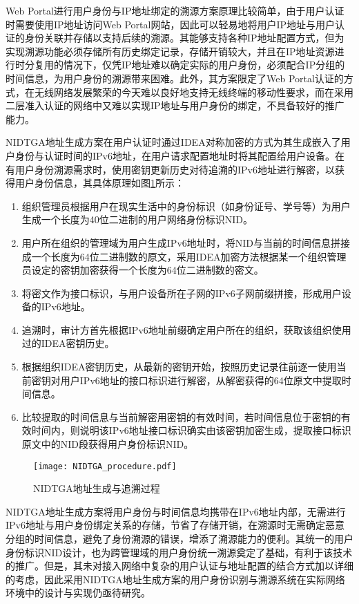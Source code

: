       Web Portal进行用户身份与IP地址绑定的溯源方案原理比较简单，由于用户认证时需要使用IP地址访问Web Portal网站，因此可以轻易地将用户IP地址与用户认证的身份关联并存储以支持后续的溯源。其能够支持各种IP地址配置方式，但为实现溯源功能必须存储所有历史绑定记录，存储开销较大，并且在IP地址资源进行时分复用的情况下，仅凭IP地址难以确定实际的用户身份，必须配合IP分组的时间信息，为用户身份的溯源带来困难。此外，其方案限定了Web Portal认证的方式，在无线网络发展繁荣的今天难以良好地支持无线终端的移动性要求，而在采用二层准入认证的网络中又难以实现IP地址与用户身份的绑定，不具备较好的推广能力。
    
      NIDTGA地址生成方案\cite{liu2015building}在用户认证时通过IDEA对称加密的方式为其生成嵌入了用户身份与认证时间的IPv6地址，在用户请求配置地址时将其配置给用户设备。在有用户身份溯源需求时，使用密钥更新历史对待追溯的IPv6地址进行解密，以获得用户身份信息，其具体原理如图\ref{fig:NIDTGA_procedure}所示：
      \begin{enumerate}[1{)}]
        \item 组织管理员根据用户在现实生活中的身份标识（如身份证号、学号等）为用户生成一个长度为40位二进制的用户网络身份标识NID。
        \item 用户所在组织的管理域为用户生成IPv6地址时，将NID与当前的时间信息拼接成一个长度为64位二进制数的原文，采用IDEA加密方法根据某一个组织管理员设定的密钥加密获得一个长度为64位二进制数的密文。
        \item 将密文作为接口标识，与用户设备所在子网的IPv6子网前缀拼接，形成用户设备的IPv6地址。
        \item 追溯时，审计方首先根据IPv6地址前缀确定用户所在的组织，获取该组织使用过的IDEA密钥历史。
        \item 根据组织IDEA密钥历史，从最新的密钥开始，按照历史记录往前逐一使用当前密钥对用户IPv6地址的接口标识进行解密，从解密获得的64位原文中提取时间信息。
        \item 比较提取的时间信息与当前解密用密钥的有效时间，若时间信息位于密钥的有效时间内，则说明该IPv6地址接口标识确实由该密钥加密生成，提取接口标识原文中的NID段获得用户身份标识NID。
      \end{enumerate}
    
      \begin{figure}[ht]
        \centering
        \texttt{[image: NIDTGA\_procedure.pdf]}
        \caption{NIDTGA地址生成与追溯过程}
        \label{fig:NIDTGA_procedure}
      \end{figure}
    
      NIDTGA地址生成方案将用户身份与时间信息均携带在IPv6地址内部，无需进行IPv6地址与用户身份绑定关系的存储，节省了存储开销，在溯源时无需确定恶意分组的时间信息，避免了身份溯源的错误，增添了溯源能力的便利。其统一的用户身份标识NID设计，也为跨管理域的用户身份统一溯源奠定了基础，有利于该技术的推广。但是，其未对接入网络中复杂的用户认证与地址配置的结合方式加以详细的考虑，因此采用NIDTGA地址生成方案的用户身份识别与溯源系统在实际网络环境中的设计与实现仍亟待研究。

